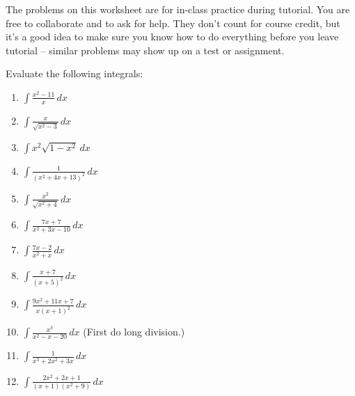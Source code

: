 \documentclass[12pt]{article}
\newcommand{\di}{\displaystyle}
\begin{document}
\thispagestyle{fancy}
The problems on this worksheet are for in-class practice during tutorial. You are free to collaborate and to ask for help. They don't count for course credit, but it's a good idea to make sure you know how to do everything before you leave tutorial -- similar problems may show up on a test or assignment.

\bigskip

Evaluate the following integrals:

 \begin{enumerate}
 \item  $\di \int \frac{x^2-11}{x}\,dx$

 \item $\di \int \frac{x}{\sqrt{x^2-3}}\,dx$

 \item $\di \int x^2\sqrt{1-x^2}\,dx$

 \item $\di \int \frac{1}{(x^2+4x+13)^2}\,dx$

 \item $\di \int \frac{x^2}{\sqrt{x^2+4}}\,dx$

 \item $\di \int \frac{7x+7}{x^2+3x-10}\,dx$

 \item $\di \int \frac{7x-2}{x^2+x}\,dx$
 
 \item $\di \int \frac{x+7}{(x+5)^2}\,dx$

 \item $\di \int \frac{9x^2+11x+7}{x(x+1)^2}\,dx$

 \item $\di \int \frac{x^3}{x^2-x-20}\,dx$ (First do long division.)

 \item $\di \int \frac{1}{x^3+2x^2+3x}\,dx$

 \item $\di \int \frac{2x^2+2x+1}{(x+1)(x^2+9)}\,dx$

 
 \end{enumerate}
\end{document}
